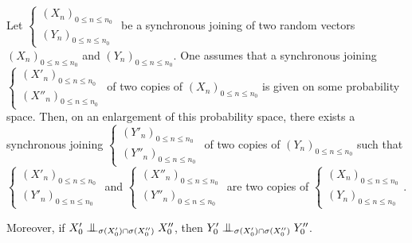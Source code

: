 \documentclass[12pt,a4paper]{article}
\begin{document}
\begin{lemma}\label{lemma:quadricoimm}
Let 
$\left\{\begin{smallmatrix} {(X_n)}_{0 \leq n \leq n_0} \\ 
{(Y_n)}_{0 \leq n \leq n_0}
\end{smallmatrix}\right.$  
be a synchronous joining of two random vectors 
${(X_n)}_{0 \leq n \leq n_0}$ and ${(Y_n)}_{0 \leq n \leq n_0}$. 
One assumes that a synchronous joining 
$\left\{\begin{smallmatrix} {(X'_n)}_{0 \leq n \leq n_0} \\ 
{(X''_n)}_{0 \leq n \leq n_0}
\end{smallmatrix}\right.$
 of two copies of ${(X_n)}_{0 \leq n \leq n_0}$ 
is given on some probability space.  
Then, on an enlargement of this probability space, there 
exists a synchronous joining 
$\left\{\begin{smallmatrix} {(Y'_n)}_{0 \leq n \leq n_0} \\ 
{(Y''_n)}_{0 \leq n \leq n_0}
\end{smallmatrix}\right.$
of two copies of ${(Y_n)}_{0 \leq n \leq n_0}$ 
such that  
$\left\{\begin{smallmatrix} {(X'_n)}_{0 \leq n \leq n_0} \\ 
{(Y'_n)}_{0 \leq n \leq n_0}
\end{smallmatrix}\right.$ and 
$\left\{\begin{smallmatrix} {(X''_n)}_{0 \leq n \leq n_0} \\ 
{(Y''_n)}_{0 \leq n \leq n_0}
\end{smallmatrix}\right.$
are two copies of 
$\left\{\begin{smallmatrix} {(X_n)}_{0 \leq n \leq n_0} \\ 
{(Y_n)}_{0 \leq n \leq n_0}
\end{smallmatrix}\right.$.

Moreover, if $X'_0 \indep_{\sigma(X'_0)\cap\sigma(X''_0)} X''_0$, then 
 $Y'_0 \indep_{\sigma(X'_0)\cap\sigma(X''_0)} Y''_0$.
\end{lemma}
\end{document}
